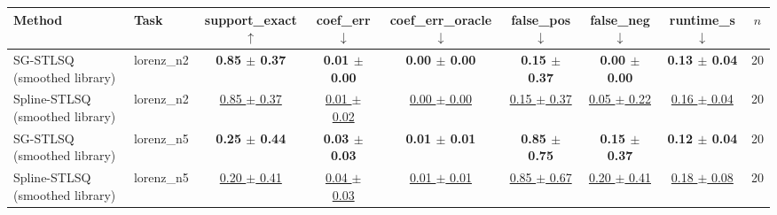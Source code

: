 \begin{tabular}{llccccccc}
\toprule
Method & Task & support\_exact $\uparrow$ & coef\_err $\downarrow$ & coef\_err\_oracle $\downarrow$ & false\_pos $\downarrow$ & false\_neg $\downarrow$ & runtime\_s $\downarrow$ & $n$ \\
\midrule
SG-STLSQ (smoothed library) & lorenz\_n2 & \textbf{0.85 $\pm$ 0.37} & \textbf{0.01 $\pm$ 0.00} & \textbf{0.00 $\pm$ 0.00} & \textbf{0.15 $\pm$ 0.37} & \textbf{0.00 $\pm$ 0.00} & \textbf{0.13 $\pm$ 0.04} & 20 \\
Spline-STLSQ (smoothed library) & lorenz\_n2 & \underline{0.85 $\pm$ 0.37} & \underline{0.01 $\pm$ 0.02} & \underline{0.00 $\pm$ 0.00} & \underline{0.15 $\pm$ 0.37} & \underline{0.05 $\pm$ 0.22} & \underline{0.16 $\pm$ 0.04} & 20 \\
\midrule
SG-STLSQ (smoothed library) & lorenz\_n5 & \textbf{0.25 $\pm$ 0.44} & \textbf{0.03 $\pm$ 0.03} & \textbf{0.01 $\pm$ 0.01} & \textbf{0.85 $\pm$ 0.75} & \textbf{0.15 $\pm$ 0.37} & \textbf{0.12 $\pm$ 0.04} & 20 \\
Spline-STLSQ (smoothed library) & lorenz\_n5 & \underline{0.20 $\pm$ 0.41} & \underline{0.04 $\pm$ 0.03} & \underline{0.01 $\pm$ 0.01} & \underline{0.85 $\pm$ 0.67} & \underline{0.20 $\pm$ 0.41} & \underline{0.18 $\pm$ 0.08} & 20 \\
\bottomrule
\end{tabular}
